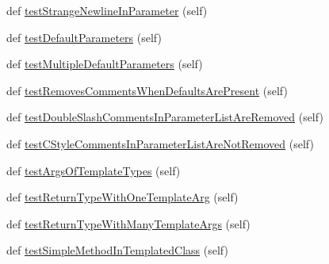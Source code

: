 \begin{DoxyCompactItemize}
\item 
def \mbox{\hyperlink{classgoogletest-master_1_1googlemock_1_1scripts_1_1generator_1_1cpp_1_1gmock__class__test_1_1_generate_methods_test_a076b44a1b5f426af7163a70ba69f6684}{test\+Strange\+Newline\+In\+Parameter}} (self)
\item 
def \mbox{\hyperlink{classgoogletest-master_1_1googlemock_1_1scripts_1_1generator_1_1cpp_1_1gmock__class__test_1_1_generate_methods_test_a61028347d99454b4cabfa9ea9dc8fde5}{test\+Default\+Parameters}} (self)
\item 
def \mbox{\hyperlink{classgoogletest-master_1_1googlemock_1_1scripts_1_1generator_1_1cpp_1_1gmock__class__test_1_1_generate_methods_test_a6b2f256283c9080f2340885601fe5870}{test\+Multiple\+Default\+Parameters}} (self)
\item 
def \mbox{\hyperlink{classgoogletest-master_1_1googlemock_1_1scripts_1_1generator_1_1cpp_1_1gmock__class__test_1_1_generate_methods_test_a8b657ad7d98c3b842f15fdae10e174fd}{test\+Removes\+Comments\+When\+Defaults\+Are\+Present}} (self)
\item 
def \mbox{\hyperlink{classgoogletest-master_1_1googlemock_1_1scripts_1_1generator_1_1cpp_1_1gmock__class__test_1_1_generate_methods_test_a431e4fca0370b80ecf938fb4a1dff9d8}{test\+Double\+Slash\+Comments\+In\+Parameter\+List\+Are\+Removed}} (self)
\item 
def \mbox{\hyperlink{classgoogletest-master_1_1googlemock_1_1scripts_1_1generator_1_1cpp_1_1gmock__class__test_1_1_generate_methods_test_a3d2e4836509192f5a0ca1d945637e54a}{test\+C\+Style\+Comments\+In\+Parameter\+List\+Are\+Not\+Removed}} (self)
\item 
def \mbox{\hyperlink{classgoogletest-master_1_1googlemock_1_1scripts_1_1generator_1_1cpp_1_1gmock__class__test_1_1_generate_methods_test_a891a906d416c56eaaeda95a0ef816b83}{test\+Args\+Of\+Template\+Types}} (self)
\item 
def \mbox{\hyperlink{classgoogletest-master_1_1googlemock_1_1scripts_1_1generator_1_1cpp_1_1gmock__class__test_1_1_generate_methods_test_aeaed356ae985249aaf16a601eb9de721}{test\+Return\+Type\+With\+One\+Template\+Arg}} (self)
\item 
def \mbox{\hyperlink{classgoogletest-master_1_1googlemock_1_1scripts_1_1generator_1_1cpp_1_1gmock__class__test_1_1_generate_methods_test_aa1c337ff3fbaa6d23406348ae8700b67}{test\+Return\+Type\+With\+Many\+Template\+Args}} (self)
\item 
def \mbox{\hyperlink{classgoogletest-master_1_1googlemock_1_1scripts_1_1generator_1_1cpp_1_1gmock__class__test_1_1_generate_methods_test_a9375be0a371dda57154848a63a40ea45}{test\+Simple\+Method\+In\+Templated\+Class}} (self)

\end{DoxyCompactItemize}
